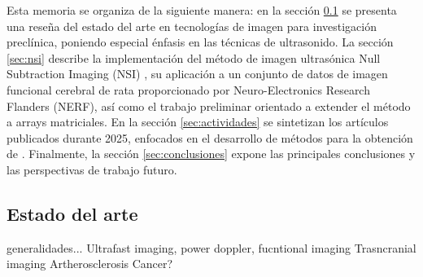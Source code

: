 \documentclass[10pt,a4paper]{article}
\begin{document}
Esta memoria se organiza de la siguiente manera: en la sección \ref{sec:estado_arte} se presenta una reseña del estado del arte en tecnologías de imagen para investigación preclínica, poniendo especial énfasis en las técnicas de ultrasonido. La sección \ref{sec:nsi} describe la implementación del método de imagen ultrasónica Null Subtraction Imaging (NSI) \cite{Agarwal2019_NSI}, su aplicación a un conjunto de datos de imagen funcional cerebral de rata proporcionado por Neuro-Electronics Research Flanders (NERF), así como el trabajo preliminar orientado a extender el método a arrays matriciales. En la sección \ref{sec:actividades} se sintetizan los artículos publicados durante 2025, enfocados en el desarrollo de métodos para la obtención de . Finalmente, la sección \ref{sec:conclusiones} expone las principales conclusiones y las perspectivas de trabajo futuro.



\subsection{Estado del arte}\label{sec:estado_arte}

generalidades...
Ultrafast imaging, power doppler, fucntional imaging
Trasncranial imaging
Artherosclerosis
Cancer?
\end{document}
